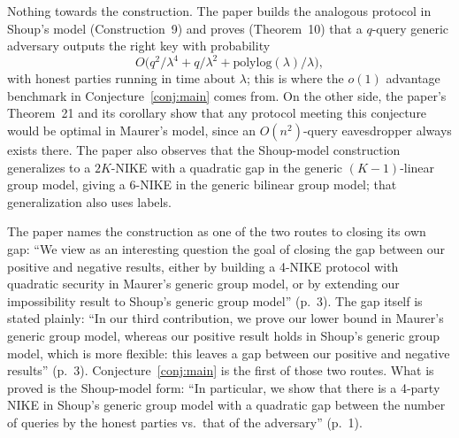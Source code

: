 \documentclass{aicr-conjecture}
\newcommand{\polylog}{\mathrm{polylog}}
\begin{document}
\begin{remark}\label{rem:progress}
Nothing towards the construction. The paper builds the analogous
protocol in Shoup's model (Construction~9) and proves (Theorem~10) that
a $q$-query generic adversary outputs the right key with probability
\[
  O\bigl(q^{2}/\lambda^{4} + q/\lambda^{2}
  + \polylog(\lambda)/\lambda\bigr),
\]
with honest parties running in time about $\lambda$; this is where the
$o(1)$ advantage benchmark in Conjecture~\ref{conj:main} comes from. On
the other side, the paper's Theorem~21 and its corollary show that any
protocol meeting this conjecture would be optimal in Maurer's model,
since an $O(n^{2})$-query eavesdropper always exists there. The paper
also observes that the Shoup-model construction generalizes to a
$2K$-NIKE with a quadratic gap in the generic $(K-1)$-linear group
model, giving a 6-NIKE in the generic bilinear group model; that
generalization also uses labels.
\end{remark}

\begin{remark}[Openness]\label{rem:open}
The paper names the construction as one of the two routes to closing its
own gap: ``We view as an interesting question the goal of closing the
gap between our positive and negative results, either by building a
4-NIKE protocol with quadratic security in Maurer's generic group model,
or by extending our impossibility result to Shoup's generic group
model'' (p.~3). The gap itself is stated plainly: ``In our third
contribution, we prove our lower bound in Maurer's generic group model,
whereas our positive result holds in Shoup's generic group model, which
is more flexible: this leaves a gap between our positive and negative
results'' (p.~3). Conjecture~\ref{conj:main} is the first of those two
routes. What is proved is the Shoup-model form: ``In particular, we show
that there is a 4-party NIKE in Shoup's generic group model with a
quadratic gap between the number of queries by the honest parties
vs.\ that of the adversary'' (p.~1).
\end{remark}
\end{document}
